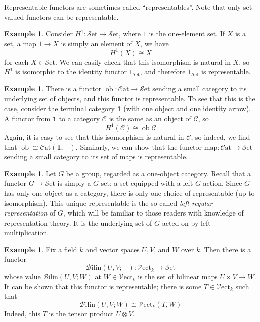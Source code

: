 \documentclass[10pt,oneside]{book}
\def\~#1{\mathscr{#1}}
\newcommand{\ob}{\mathop{\mathrm{ob}}}
\newcommand{\Set}{\~S\mathrm{et}}
\newcommand{\Vect}{\~V\mathrm{ect}}
\newcommand{\Cat}{\~C\mathrm{at}}
\newcommand{\Bilin}{\~{B}\mathrm{ilin}}
\theoremstyle{plain}
\theoremstyle{definition}
\newtheorem{ex}[thm]{Example}
\theoremstyle{remark}
\numberwithin{equation}{section}
\numberwithin{figure}{section}
\begin{document}
Representable functors are sometimes called ``representables''. Note that only set-valued functors can be representable. 

\begin{ex}
    Consider $H^1: \Set \to \Set$, where $1$ is the one-element set. If $X$ is a set, a map $1 \to X$ is simply an element of $X$, we have
    \[H^1(X) \cong X\]
    for each $X \in \Set$. We can easily check that this isomorphism is natural in $X$, so $H^1$ is isomorphic to the identity functor $1_{\Set}$, and therefore $1_{\Set}$ is representable.
\end{ex}

\begin{ex}
    There is a functor $\ob: \Cat \to \Set$ sending a small category to its underlying set of objects, and this functor is representable. To see that this is the case, consider the terminal category $\mathbf{1}$ (with one object and one identity arrow). A functor from $\mathbf{1}$ to a category $\~C$ is the same as an object of $\~C$, so 
    \[H^1(\~C) \cong \ob \~C\]
    Again, it is easy to see that this isomorphism is natural in $\~C$, so indeed, we find that $\ob \cong \Cat(\mathbf{1}, -)$. Similarly, we can show that the functor $\mathrm{map}: \Cat \to \Set$ sending a small category to its set of maps is representable.
\end{ex}

\begin{ex}
    Let $G$ be a group, regarded as a one-object category. Recall that a functor $G \to \Set$ is simply a $G$-set: a set equipped with a left $G$-action. Since $G$ has only one object as a category, there is only one choice of representable (up to isomorphism). This unique representable is the so-called \emph{left regular representation} of $G$, which will be familiar to those readers with knowledge of representation theory. It is the underlying set of $G$ acted on by left multiplication.
\end{ex}

\begin{ex}
    Fix a field $k$ and vector spaces $U, V$, and $W$ over $k$. Then there is a functor
    \[\Bilin(U, V; -): \Vect_k \to \Set\]
    whose value $\Bilin(U, V; W)$ at $W \in \Vect_k$ is the set of bilinear maps $U \times V \to W$. It can be shown that this functor is representable; there is some $T \in \Vect_k$ such that
    \[\Bilin(U, V; W) \cong \Vect_k(T, W)\]
    Indeed, this $T$ is the tensor product $U \otimes V$.
\end{ex}
\end{document}
